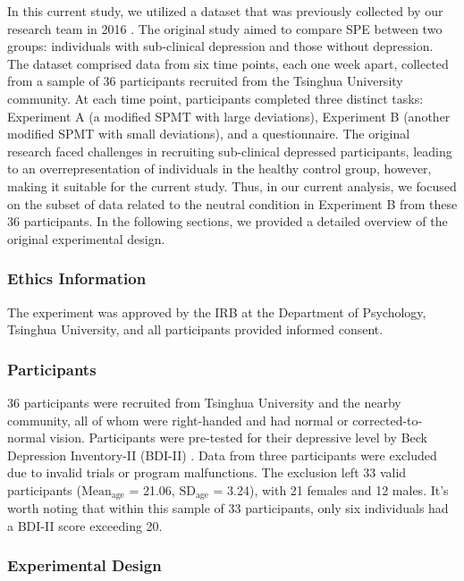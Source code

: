 \documentclass[sn-apa]{sn-jnl}%
\theoremstyle{thmstyleone}%
\theoremstyle{thmstyletwo}%
\theoremstyle{thmstylethree}%
\begin{document}
In this current study, we utilized a dataset that was previously collected by our research team in 2016 \parencite{hu2023data}. The original study aimed to compare SPE between two groups: individuals with sub-clinical depression and those without depression. The dataset comprised data from six time points, each one week apart, collected from a sample of 36 participants recruited from the Tsinghua University community. At each time point, participants completed three distinct tasks: Experiment A (a modified SPMT with large deviations), Experiment B (another modified SPMT with small deviations), and a questionnaire. The original research faced challenges in recruiting sub-clinical depressed participants, leading to an overrepresentation of individuals in the healthy control group, however, making it suitable for the current study. Thus, in our current analysis, we focused on the subset of data related to the neutral condition in Experiment B from these 36 participants. In the following sections, we provided a detailed overview of the original experimental design. 

\subsubsection{Ethics Information}\label{subsec:ethics}

The experiment was approved by the IRB at the Department of Psychology, Tsinghua University, and all participants provided informed consent.

\subsubsection{Participants}\label{subsec:participants}

36 participants were recruited from Tsinghua University and the nearby community, all of whom were right-handed and had normal or corrected-to-normal vision. Participants were pre-tested for their depressive level by Beck Depression Inventory-II (BDI-II) \parencite{wang2011reliability}. Data from three participants were excluded due to invalid trials or program malfunctions. The exclusion left 33 valid participants ($\text{Mean}_{\text{age}}$ = 21.06, $\text{SD}_{\text{age}}$ = 3.24), with 21 females and 12 males. It's worth noting that within this sample of 33 participants, only six individuals had a BDI-II score exceeding 20.

\subsubsection{Experimental Design}\label{subsec:experimentaldesign}
\end{document}
